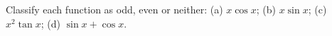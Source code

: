 Classify each function as odd, even or neither: (a) $x\cos x$; (b) $x\sin x$; (c) $x^2\tan x$; (d) $\sin x+\cos x$.
